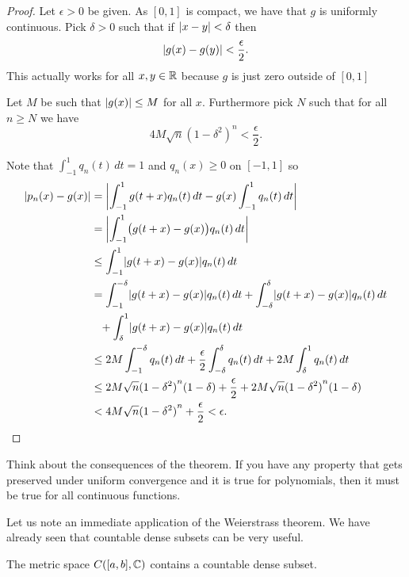 \begin{proof}
Let $\epsilon > 0$ be given.
As $[0,1]$ is compact, we have that $g$ is uniformly continuous.
Pick $\delta > 0$ such that if $\lvert {x-y} \rvert < \delta$ then
\begin{equation*}
\lvert {g(x)-g(y)} \rvert < \frac{\epsilon}{2} .
\end{equation*}
This actually works for all $x,y \in {\mathbb{R}}$ because $g$ is just zero outside
of $[0,1]$

Let $M$ be such that $\lvert {g(x)} \rvert \leq M$ for all $x$.  Furthermore pick $N$
such that for all $n \geq N$
we have
\begin{equation*}
4M\sqrt{n}{(1-\delta^2)}^n < \frac{\epsilon}{2} .
\end{equation*}

Note that 
$\int_{-1}^1 q_n(t)\,dt = 1$ and $q_n(x) \geq 0$ on $[-1,1]$ so
\begin{equation*}
\begin{split}
\lvert {p_n(x)-g(x)} \rvert & =
\left\lvert {\int_{-1}^1 g(t+x)q_n(t)\,dt
-g(x)\int_{-1}^1 q_n(t)\,dt} \right\rvert \\
& =
\left\lvert {\int_{-1}^1 \bigl(g(t+x)-g(x)\bigr)q_n(t)\,dt} \right\rvert \\
& \leq
\int_{-1}^1 \lvert {g(t+x)-g(x)} \rvert q_n(t)\,dt \\
& =
\int_{-1}^{-\delta} \lvert {g(t+x)-g(x)} \rvert q_n(t)\,dt
+
\int_{-\delta}^{\delta} \lvert {g(t+x)-g(x)} \rvert q_n(t)\,dt
\\
& \phantom{\leq} +
\int_{\delta}^1 \lvert {g(t+x)-g(x)} \rvert q_n(t)\,dt \\
& \leq
2M
\int_{-1}^{-\delta} q_n(t)\,dt
+
\frac{\epsilon}{2}
\int_{-\delta}^{\delta} q_n(t)\,dt
+
2M
\int_{\delta}^1 q_n(t)\,dt \\
& \leq
2M\sqrt{n}{(1-\delta^2)}^n(1-\delta)
+
\frac{\epsilon}{2}
+
2M\sqrt{n}{(1-\delta^2)}^n(1-\delta) \\
& <
4M\sqrt{n}{(1-\delta^2)}^n
+
\frac{\epsilon}{2}
< \epsilon . \qedhere
\end{split}
\end{equation*}
\end{proof}

Think about the consequences of the theorem.  If you have any property that
gets preserved under uniform convergence and it is true for polynomials,
then it must be true for all continuous functions.

Let us note an immediate application of the Weierstrass theorem.  We have
already seen that countable dense subsets can be very useful.

\begin{cor}
The metric space $C([a,b],{\mathbb{C}})$ contains a countable dense subset.
\end{cor}

